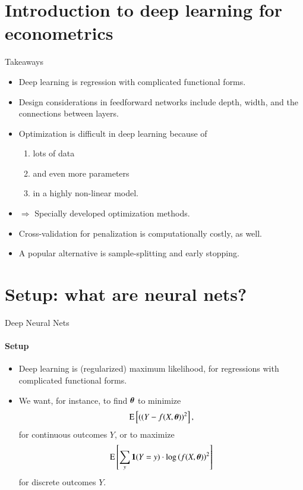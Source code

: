\documentclass[notes, ignorenonframetext, compress, 10pt, xcolor=svgnames, aspectratio=169]{beamer}
\begin{document}
\section{Introduction to deep learning for econometrics}
\frame{\sectionpage}
\begin{frame}[allowframebreaks]{Takeaways}
\begin{itemize}
\item Deep learning is regression with complicated functional forms.
\item Design considerations in feedforward networks include depth, width, and the
connections between layers.
\item Optimization is difficult in deep learning because of
\begin{enumerate}
\item lots of data
\item  and even more parameters
\item in a highly non-linear model.
\end{enumerate}
\item $\Rightarrow$  Specially developed optimization methods.
\item Cross-validation for penalization is computationally costly, as well.
\item A popular alternative is sample-splitting and early stopping.
\end{itemize}
\end{frame}

\section{Setup: what are neural nets?}
\frame{\sectionpage}
\begin{frame}[allowframebreaks]{Deep Neural Nets}
  \framesubtitle{Setup}
    \begin{itemize}
    \item  Deep learning is (regularized) maximum likelihood, for regressions with
complicated functional forms.
\item We want, for instance, to find ${\boldsymbol \theta}$ to minimize
\begin{align*}
\operatorname{E}\left[((Y - f(X, {\boldsymbol \theta}))^2\right],
\end{align*}
for continuous outcomes $Y$, or to maximize
\begin{align*}
\operatorname{E}\left[\sum_{y}\mathbf{1}(Y = y)\cdot\log\left(f(X, {\boldsymbol \theta})\right)^2\right]
\end{align*}
for discrete outcomes $Y$.
    \end{itemize}
\end{frame}
\end{document}
